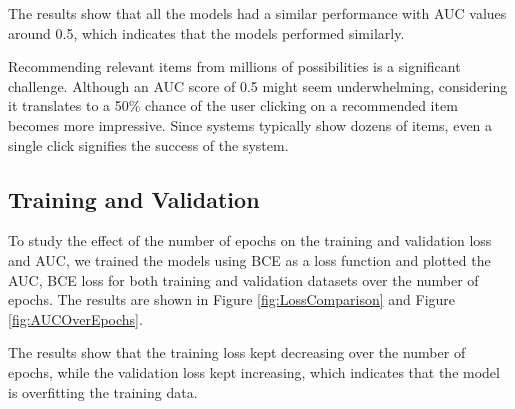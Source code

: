 The results show that all the models had a similar performance with AUC values around 0.5, which indicates that the models performed similarly.

Recommending relevant items from millions of possibilities is a significant challenge. 
Although an AUC score of 0.5 might seem underwhelming, 
considering it translates to a 50\% chance of the user clicking on a recommended item becomes more impressive. 
Since systems typically show dozens of items, even a single click signifies the success of the system.

\subsection{Training and Validation}

To study the effect of the number of epochs on the training and validation loss and AUC, we trained the models using BCE as a loss function and plotted the AUC, BCE loss for both training and validation datasets over the number of epochs.
The results are shown in Figure \ref{fig:LossComparison} and Figure \ref{fig:AUCOverEpochs}.

The results show that the training loss kept decreasing over the number of epochs, while the validation loss kept increasing, which indicates that the model is overfitting the training data.

